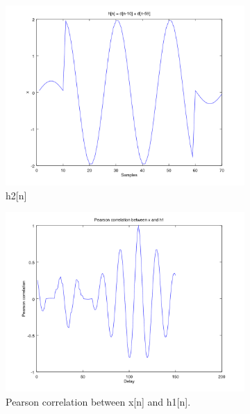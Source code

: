 \documentclass{article}
\begin{document}
\begin{figure}[H]
\begin{subfigure}{.49\textwidth}
    \includegraphics[width=\textwidth]{plot2b3.png}
    \caption{h2[n]}
    \label{fig:2b3}
  \end{subfigure}
  \begin{subfigure}{.49\textwidth}
    \centering
    \includegraphics[width=\textwidth]{plot2b4.png}
    \caption{Pearson correlation between x[n] and h1[n].}
    \label{fig:2b4}
  \end{subfigure}
  \begin{subfigure}{.49\textwidth}
    \centering

\end{subfigure}
\end{figure}
\end{document}
